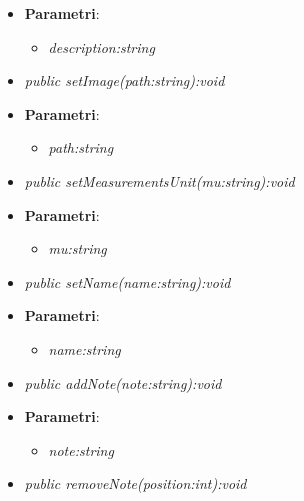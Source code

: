 \begin{itemize}
\begin{itemize}
\begin{itemize}
				\item{\textbf{Parametri}: \begin{itemize}
				\item \textit{description:string}\\

			\end{itemize}}
	\item \textit{public setImage(path:string):void}\\
	
				\item{\textbf{Parametri}: \begin{itemize}
				\item \textit{path:string}\\

			\end{itemize}}
	\item \textit{public setMeasurementsUnit(mu:string):void}\\
	
				\item{\textbf{Parametri}: \begin{itemize}
				\item \textit{mu:string}\\

			\end{itemize}}
	\item \textit{public setName(name:string):void}\\
	
				\item{\textbf{Parametri}: \begin{itemize}
				\item \textit{name:string}\\

			\end{itemize}}

	\item \textit{public addNote(note:string):void}\\
	
				\item{\textbf{Parametri}: \begin{itemize}
				\item \textit{note:string}\\

			\end{itemize}}
	\item \textit{public removeNote(position:int):void}\\
	

\end{itemize}
\end{itemize}
\end{itemize}
